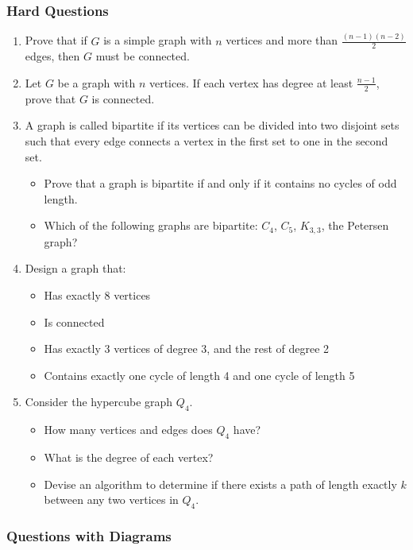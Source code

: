 \documentclass{article}
\theoremstyle{definition}
\begin{document}
\subsubsection{Hard Questions}

\begin{enumerate}[resume]
\item Prove that if $G$ is a simple graph with $n$ vertices and more than $\frac{(n-1)(n-2)}{2}$ edges, then $G$ must be connected.

\item Let $G$ be a graph with $n$ vertices. If each vertex has degree at least $\frac{n-1}{2}$, prove that $G$ is connected.

\item A graph is called bipartite if its vertices can be divided into two disjoint sets such that every edge connects a vertex in the first set to one in the second set.
\begin{itemize}
    \item Prove that a graph is bipartite if and only if it contains no cycles of odd length.
    \item Which of the following graphs are bipartite: $C_4$, $C_5$, $K_{3,3}$, the Petersen graph?
\end{itemize}

\item Design a graph that:
\begin{itemize}
    \item Has exactly 8 vertices
    \item Is connected
    \item Has exactly 3 vertices of degree 3, and the rest of degree 2
    \item Contains exactly one cycle of length 4 and one cycle of length 5
\end{itemize}

\item Consider the hypercube graph $Q_4$.
\begin{itemize}
    \item How many vertices and edges does $Q_4$ have?
    \item What is the degree of each vertex?
    \item Devise an algorithm to determine if there exists a path of length exactly $k$ between any two vertices in $Q_4$.
\end{itemize}
\end{enumerate}

\subsubsection{Questions with Diagrams}
\end{document}
